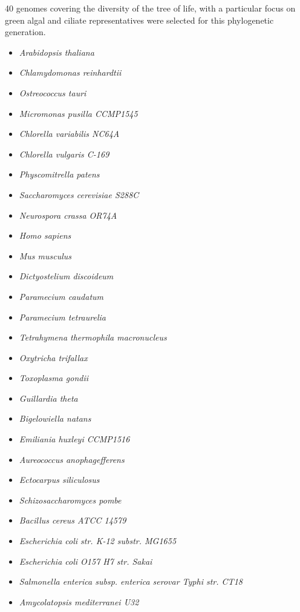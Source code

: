40 genomes covering the diversity of the tree of life, with a particular focus on green algal and ciliate representatives 
were selected for this phylogenetic generation.
\begin{itemize}
    \item \textit{Arabidopsis thaliana}
    \item \textit{Chlamydomonas reinhardtii }
    \item \textit{Ostreococcus tauri}
    \item \textit{Micromonas pusilla CCMP1545}
    \item \textit{Chlorella variabilis NC64A}
    \item \textit{Chlorella vulgaris C-169}
    \item \textit{Physcomitrella patens}
    \item \textit{Saccharomyces cerevisiae S288C}
    \item \textit{Neurospora crassa OR74A}
    \item \textit{Homo sapiens}
    \item \textit{Mus musculus}
    \item \textit{Dictyostelium discoideum}
    \item \textit{Paramecium caudatum}
    \item \textit{Paramecium tetraurelia}
    \item \textit{Tetrahymena thermophila macronucleus}
    \item \textit{Oxytricha trifallax}
    \item \textit{Toxoplasma gondii}
    \item \textit{Guillardia theta}
    \item \textit{Bigelowiella natans}
    \item \textit{Emiliania huxleyi CCMP1516 }
    \item \textit{Aureococcus anophagefferens}
    \item \textit{Ectocarpus siliculosus}
    \item \textit{Schizosaccharomyces pombe}
    \item \textit{Bacillus cereus ATCC 14579}
    \item \textit{Escherichia coli str. K-12 substr. MG1655}
    \item \textit{Escherichia coli O157 H7 str. Sakai}
    \item \textit{Salmonella enterica subsp. enterica serovar Typhi str. CT18}
    \item \textit{Amycolatopsis mediterranei U32}

\end{itemize}
